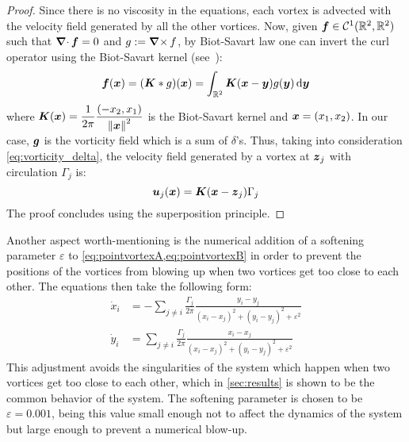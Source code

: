 \documentclass[../main.tex]{subfiles}
\begin{document}
\begin{proof}
	Since there is no viscosity in the equations, each vortex is advected with the velocity field generated by all the other vortices. Now, given $\boldsymbol{f}\in \mathcal{C}^1(\mathbb{R}^2,\mathbb{R}^2)$ such that $\operatorname{\boldsymbol{\nabla}\cdot} \boldsymbol{f} = 0$ and $g:=\operatorname{\boldsymbol{\nabla}\times} f$, by Biot-Savart law one can invert the curl operator using the Biot-Savart kernel (see~\cite{Griffiths}):
	\begin{equation}\label{eq:biotsavart}
		\boldsymbol{f}(\boldsymbol{x}) = (\boldsymbol{K} * g)(\boldsymbol{x}) = \int_{\mathbb{R}^2} \boldsymbol{K}(\boldsymbol{x}-\boldsymbol{y}) g(\boldsymbol{y}) \dd{\boldsymbol{y}}
	\end{equation}
	where $\displaystyle\boldsymbol{K}(\boldsymbol{x}) = \frac{1}{2\pi} \frac{(-x_2,x_1)}{{\left\|\boldsymbol{x}\right\|^2}}$ is the Biot-Savart kernel and $\boldsymbol{x}=(x_1,x_2)$. In our case, $\boldsymbol{g}$ is the vorticity field which is a sum of $\delta$'s. Thus, taking into consideration \cref{eq:vorticity_delta}, the velocity field generated by a vortex at $\boldsymbol{z}_j$ with circulation $\Gamma_j$ is:
	\begin{equation}
		\boldsymbol{u}_j(\boldsymbol{x}) = \boldsymbol{K}(\boldsymbol{x}-\boldsymbol{z}_j) \Gamma_j
	\end{equation}
	The proof concludes using the superposition principle.
\end{proof}
Another aspect worth-mentioning is the numerical addition of a softening parameter $\varepsilon$ to \cref{eq:pointvortexA,eq:pointvortexB} in order to prevent the positions of the vortices from blowing up when two vortices get too close to each other. The equations then take the following form:
\begin{align}\label{eq:pointvortexA_soft}
	\dot{x}_i & = -\sum_{j\neq i} \frac{\Gamma_j}{2\pi} \frac{y_i-y_j}{{(x_i-x_j)}^2+{(y_i-y_j)}^2+\varepsilon^2} \\
	\label{eq:pointvortexB_soft}
	\dot{y}_i & = \sum_{j\neq i} \frac{\Gamma_j}{2\pi} \frac{x_i-x_j}{{(x_i-x_j)}^2+{(y_i-y_j)}^2+\varepsilon^2}
\end{align}
This adjustment avoids the singularities of the system which happen when two vortices get too close to each other, which in \cref{sec:results} is shown to be the common behavior of the system. The softening parameter is chosen to be $\varepsilon=0.001$, being this value small enough not to affect the dynamics of the system but large enough to prevent a numerical blow-up.
\end{document}
